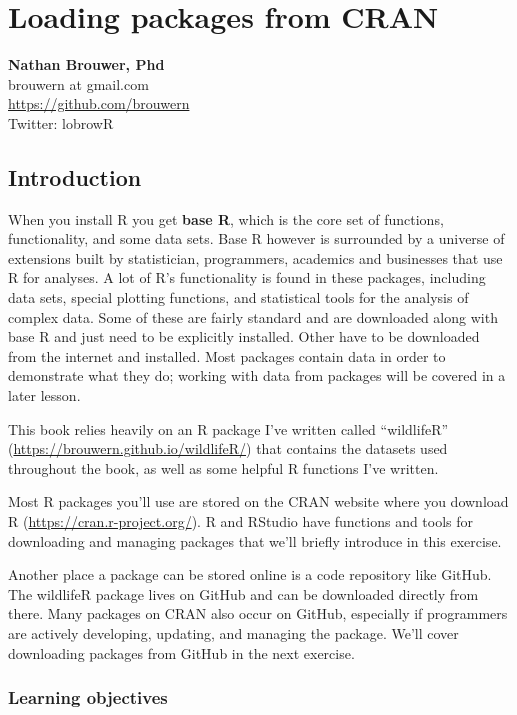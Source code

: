 \documentclass[]{book}
\theoremstyle{definition}
\theoremstyle{definition}
\theoremstyle{definition}
\theoremstyle{remark}
\begin{document}
\chapter{Loading packages from CRAN}\label{loading-packages-from-cran}

\textbf{Nathan Brouwer, Phd}\\
brouwern at gmail.com\\
\url{https://github.com/brouwern}\\
Twitter: lobrowR

\section{Introduction}\label{introduction}

When you install R you get \textbf{base R}, which is the core set of
functions, functionality, and some data sets. Base R however is
surrounded by a universe of extensions built by statistician,
programmers, academics and businesses that use R for analyses. A lot of
R's functionality is found in these packages, including data sets,
special plotting functions, and statistical tools for the analysis of
complex data. Some of these are fairly standard and are downloaded along
with base R and just need to be explicitly installed. Other have to be
downloaded from the internet and installed. Most packages contain data
in order to demonstrate what they do; working with data from packages
will be covered in a later lesson.

This book relies heavily on an R package I've written called
``wildlifeR'' (\url{https://brouwern.github.io/wildlifeR/}) that
contains the datasets used throughout the book, as well as some helpful
R functions I've written.

Most R packages you'll use are stored on the CRAN website where you
download R (\url{https://cran.r-project.org/}). R and RStudio have
functions and tools for downloading and managing packages that we'll
briefly introduce in this exercise.

Another place a package can be stored online is a code repository like
GitHub. The wildlifeR package lives on GitHub and can be downloaded
directly from there. Many packages on CRAN also occur on GitHub,
especially if programmers are actively developing, updating, and
managing the package. We'll cover downloading packages from GitHub in
the next exercise.

\subsection{Learning objectives}\label{learning-objectives}
\end{document}
